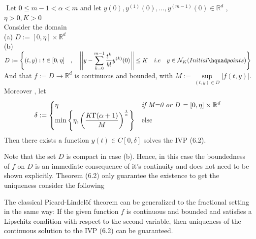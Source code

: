 \begin{theorem}
    $ $ \newline
    Let $0 \leq m-1 < \alpha < m $ and let $y(0),y^{(1)}(0),\dots,y^{(m-1)}(0) \in \mathbb{R}^d $ , $\eta>0,K>0$ 
    \\
    Consider the domain
    \\(a) $D := [0, \eta]\times\mathbb{R}^d$
    \\(b) $\displaystyle D := \left\{ (t,y) : t \in [0, \eta] \quad,\quad \left|\left| y-\sum_{k=0}^{m-1} \frac{t^k}{k!} y^{(k)}(0) \right|\right| \leq K \quad i.e \quad y \in \mathcal{N}_K(Initial \hquad points) \right\} $
    \\
    And that $f := D \to \mathbb{R}^d$ is continuous and bounded, with $M := \sup\limits_{(t,y)\in D} |f(t,y)|$. Moreover , let
    \begin{equation}
        \delta := \begin{cases}
            \eta     & \text{\textit{if M=0 or D = $[0, \eta]\times\mathbb{R}^d$}}
            \\
            \displaystyle \min\left\{\eta , \left(\frac{K\Gamma(\alpha+1)}{M}\right)^{\frac{1}{\alpha}} \right\} &\text{else}
        \end{cases}
    \end{equation}
    Then there exists a function $y(t) \in C[0, \delta]$ solves the IVP (6.2).
\end{theorem}

Note that the set $D$ is compact in case (b). Hence, in this case the boundedness of
$f$ on $D$ is an immediate consequence of it's continuity and does not need to be shown
explicitly.
Theorem (6.2) only guarantee the existence to get the uniqueness consider the following

The classical Picard-Lindelöf theorem can be generalized to the fractional setting
in the same way: If the given function $f$ is continuous and bounded and satisfies 
a Lipschitz condition with respect to the second variable, then uniqueness of the 
continuous solution to the IVP (6.2) can be guaranteed.


